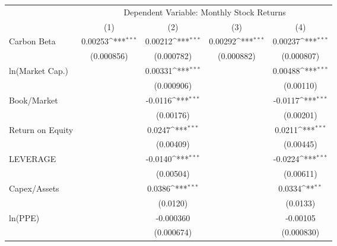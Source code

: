 {
\def\sym#1{\ifmmode^{#1}\else\(^{#1}\)\fi}
\begin{tabular}{l*{4}{c}}
\hline\hline
                    &\multicolumn{4}{c}{Dependent Variable: Monthly Stock Returns}                          \\\cmidrule(lr){2-5}
                    &\multicolumn{1}{c}{(1)}         &\multicolumn{1}{c}{(2)}         &\multicolumn{1}{c}{(3)}         &\multicolumn{1}{c}{(4)}         \\
\hline
Carbon Beta         &     0.00253\sym{***}&     0.00212\sym{***}&     0.00292\sym{***}&     0.00237\sym{***}\\
                    &  (0.000856)         &  (0.000782)         &  (0.000882)         &  (0.000807)         \\
ln(Market Cap.)     &                     &     0.00331\sym{***}&                     &     0.00488\sym{***}\\
                    &                     &  (0.000906)         &                     &   (0.00110)         \\
Book/Market         &                     &     -0.0116\sym{***}&                     &     -0.0117\sym{***}\\
                    &                     &   (0.00176)         &                     &   (0.00201)         \\
Return on Equity    &                     &      0.0247\sym{***}&                     &      0.0211\sym{***}\\
                    &                     &   (0.00409)         &                     &   (0.00445)         \\
LEVERAGE            &                     &     -0.0140\sym{***}&                     &     -0.0224\sym{***}\\
                    &                     &   (0.00504)         &                     &   (0.00611)         \\
Capex/Assets        &                     &      0.0386\sym{***}&                     &      0.0334\sym{**} \\
                    &                     &    (0.0120)         &                     &    (0.0133)         \\
ln(PPE)             &                     &   -0.000360         &                     &    -0.00105         \\
                    &                     &  (0.000674)         &                     &  (0.000830)         \\

\end{tabular}}
